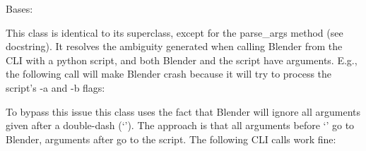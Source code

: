 \documentclass[letterpaper,10pt,english,openany,oneside]{sphinxmanual}
\begin{document}
\begin{fulllineitems}
\label{\detokenize{io_anim_mvnx:io_anim_mvnx.utils.ArgumentParserForBlender}}
Bases: 

This class is identical to its superclass, except for the parse\_args
method (see docstring). It resolves the ambiguity generated when calling
Blender from the CLI with a python script, and both Blender and the script
have arguments. E.g., the following call will make Blender crash because
it will try to process the script’s -a and -b flags:

\begin{sphinxVerbatim}[commandchars=\\\{\}]
      
\end{sphinxVerbatim}

To bypass this issue this class uses the fact that Blender will ignore all
arguments given after a double-dash (‘\textendash{}’). The approach is that all
arguments before ‘\textendash{}’ go to Blender, arguments after go to the script.
The following CLI calls work fine:

\begin{sphinxVerbatim}[commandchars=\\\{\}]
       
   
\end{sphinxVerbatim}


\end{fulllineitems}
\end{document}
